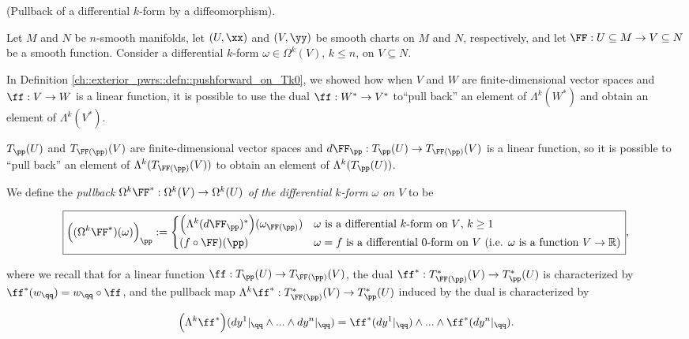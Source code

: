 \begin{defn}
\label{ch::diff_forms::defn::pullback_of_diff_form_by_diffeomorphism}
    (Pullback of a differential $k$-form by a diffeomorphism).
    
    Let $M$ and $N$ be $n$-smooth manifolds, let $(U, \xx)$ and $(V, \yy)$ be smooth charts on $M$ and $N$, respectively, and let $\FF:U \subseteq M \rightarrow V \subseteq N$ be a smooth function. Consider a differential $k$-form $\omega \in \Omega^k(V)$, $k \leq n$, on $V \subseteq N$.
    
    In Definition \ref{ch::exterior_pwrs::defn::pushforward_on_Tk0}, we showed how when $V$ and $W$ are finite-dimensional vector spaces and $\ff:V \rightarrow W$ is a linear function, it is possible to use the dual $\ff:W^* \rightarrow V^*$ to``pull back'' an element of $\Lambda^k(W^*)$ and obtain an element of $\Lambda^k(V^*)$. 
    
    $T_\pp(U)$ and $T_{\FF(\pp)}(V)$ are finite-dimensional vector spaces and ${d\FF_\pp:T_\pp(U) \rightarrow T_{\FF(\pp)}(V)}$ is a linear function, so it is possible to ``pull back'' an element of $\Lambda^k(T_{\FF(\pp)}(V))$ to obtain an element of $\Lambda^k(T_\pp(U))$.
    
    We define the \textit{pullback $\Omega^k \FF^*:\Omega^k(V) \rightarrow \Omega^k(U)$ of the differential $k$-form $\omega$ on $V$} to be
    
    \begin{align*}
        \boxed
        {
            \Big( (\Omega^k \FF^*)(\omega) \Big)_\pp :=
            \begin{cases}
                \Big( \Lambda^k (d\FF_\pp)^* \Big)(\omega_{\FF(\pp)}) & \text{$\omega$ is a differential $k$-form on $V$, $k \geq 1$} \\
                (f \circ \FF)(\pp) & \text{$\omega = f$ is a differential $0$-form on $V$ (i.e. $\omega$ is a function $V \rightarrow \R$)}
            \end{cases}
        },
    \end{align*}

    where we recall that for a linear function $\ff:T_\pp(U) \rightarrow T_{\FF(\pp)}(V)$, the dual $\ff^*:T_{\FF(\pp)}^*(V) \rightarrow T_\pp^*(U)$ is characterized by $\ff^*(w_\qq) = w_\qq \circ \ff$, and the pullback map $\Lambda^k \ff^*:T^*_{\FF(\pp)}(V) \rightarrow T^*_\pp(U)$ induced by the dual is characterized by

    \begin{align*}
        \Big(\Lambda^k \ff^* \Big)(dy^1|_\qq \wedge ... \wedge dy^n|_\qq) = \ff^*(dy^1|_\qq) \wedge ... \wedge \ff^*(dy^n|_\qq).
    \end{align*}
\end{defn}

